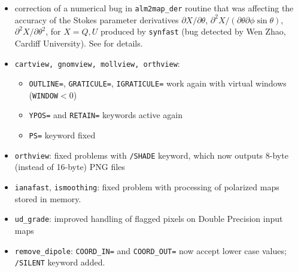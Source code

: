 \documentclass[12pt,twoside]{article}
\newcounter{append}
\begin{document}
{{%
%
%
 \begin{itemize}
	\setlength{\itemsep}{0pt}
	\setlength{\parsep}{0pt}
	\item
	correction of a numerical bug in {\tt alm2map\_der} routine that was
affecting
	the accuracy of the Stokes parameter derivatives 
$\partial X/\partial\theta$, 
$\partial^2 X/(\partial\theta\partial\phi\sin\theta)$, 
$\partial^2 X/\partial \theta^2$, 
for $X=Q,U$ produced by {\tt synfast}  (bug detected by Wen Zhao,
Cardiff University). See 
 for details.
 \end{itemize}
%
 \begin{itemize}
	\setlength{\itemsep}{0pt}
	\setlength{\parsep}{0pt}
	\item {\tt cartview, gnomview, mollview, orthview}:
        \begin{itemize}
	\setlength{\itemsep}{0pt}
	\setlength{\parsep}{0pt}
		\item {\tt OUTLINE=}, {\tt GRATICULE=}, {\tt IGRATICULE=} work
again with virtual windows ({\tt WINDOW}$<0$)
		\item {\tt YPOS=} and {\tt RETAIN=} keywords active again
		\item {\tt PS=} keyword fixed %
	\end{itemize}
	\item {\tt orthview}:
		fixed problems with {\tt /SHADE} keyword, which now
outputs 8-byte (instead of 16-byte) PNG files
	\item {\tt ianafast}, {\tt ismoothing}: fixed problem with processing of
polarized maps stored in memory.
	\item {\tt ud\_grade}: improved handling of flagged pixels on Double
Precision input maps
	\item {\tt remove\_dipole}: {\tt COORD\_IN=} and {\tt COORD\_OUT=} now
accept lower case values; {\tt /SILENT} keyword added.
 \end{itemize}

}}
\end{document}
